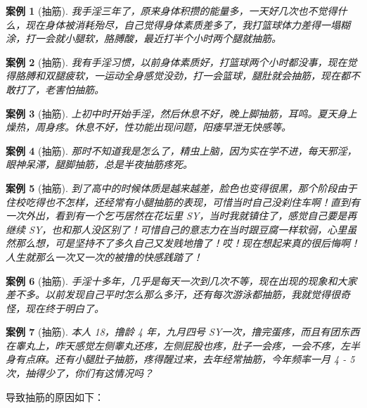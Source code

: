 \documentclass{ctexart}
\newtheorem{case}{案例}
\begin{document}
\begin{case}[抽筋]
    我手淫三年了，原来身体积攒的能量多，一天好几次也不觉得什么，现在身体被消耗殆尽，自己觉得身体素质差多了，我打篮球体力差得一塌糊涂，打一会就小腿软，胳膊酸，最近打半个小时两个腿就抽筋。
\end{case}

\begin{case}[抽筋]
    我有手淫习惯，以前身体素质好，打篮球两个小时都没事，现在觉得胳膊和双腿疲软，一运动全身感觉没劲，打一会篮球，腿肚就会抽筋，现在都不敢打了，老害怕抽筋。
\end{case}

\begin{case}[抽筋]
    上初中时开始手淫，然后休息不好，晚上脚抽筋，耳鸣。夏天身上燥热，周身疼。休息不好，性功能出现问题，阳痿早泄无快感等。
\end{case}

\begin{case}[抽筋]
    那时不知道我是怎么了，精虫上脑，因为实在学不进，每天邪淫，眼神呆滞，腿脚抽筋，总是半夜抽筋疼死。
\end{case}

\begin{case}[抽筋]
    到了高中的时候体质是越来越差，脸色也变得很黑，那个阶段由于住校吃得也不怎样，还经常有小腿抽筋的表现，可惜当时自己没刹住车啊！直到有一次外出，看到有一个乞丐居然在花坛里 SY，当时我就镇住了，感觉自己要是再继续 SY，也和那人没区别了！可惜自己的意志力在当时跟豆腐一样软弱，心里虽然那么想，可是坚持不了多久自己又发贱地撸了！哎！现在想起来真的很后悔啊！人生就那么一次又一次的被撸的快感践踏了！
\end{case}

\begin{case}[抽筋]
    手淫十多年，几乎是每天一次到几次不等，现在出现的现象和大家差不多。以前发现自己平时怎么那么多汗，还有每次游泳都抽筋，我就觉得很奇怪，现在终于明白了。
\end{case}

\begin{case}[抽筋]
    本人 18，撸龄 4 年，九月四号 SY一次，撸完蛋疼，而且有团东西在睾丸上，昨天感觉左侧睾丸还疼，左侧屁股也疼，肚子一会疼，一会不疼，左半身有点麻。还有小腿肚子抽筋，疼得醒过来，去年经常抽筋，今年频率一月 4 - 5 次，抽得少了，你们有这情况吗？
\end{case}

导致抽筋的原因如下：
\end{document}
